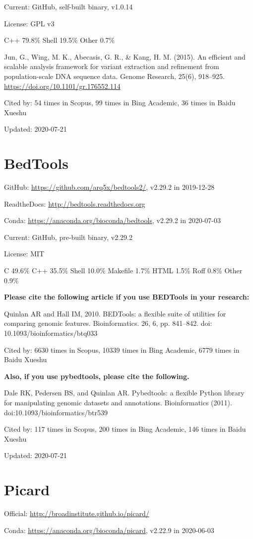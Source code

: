 \documentclass[]{article}
\newcommand{\cb}[3]{\par Cited by: {\color{blue}\Huge #1} times in Scopus, {\color{blue}\Huge #2} times in Bing Academic, {\color{blue}\Huge #3} times in Baidu Xueshu}
\begin{document}
Current: GitHub, self-built binary, v1.0.14

License: GPL v3

C++ 79.8\% Shell 19.5\% Other 0.7\%

Jun, G., Wing, M. K., Abecasis, G. R., \& Kang, H. M. (2015). An efficient and scalable analysis framework for variant extraction and refinement from population-scale DNA sequence data. Genome Research, 25(6), 918–925. \url{https://doi.org/10.1101/gr.176552.114}\cb{54}{99}{36}

Updated: 2020-07-21

\section{BedTools}

GitHub: \url{https://github.com/arq5x/bedtools2/}, v2.29.2 in 2019-12-28

ReadtheDocs: \url{http://bedtools.readthedocs.org}

Conda: \url{https://anaconda.org/bioconda/bedtools}, v2.29.2 in 2020-07-03

Current: GitHub, pre-built binary, v2.29.2

License: MIT

C 49.6\% C++ 35.5\% Shell 10.0\% Makefile 1.7\% HTML 1.5\% Roff 0.8\% Other 0.9\%

\textbf{Please cite the following article if you use BEDTools in your research:}

Quinlan AR and Hall IM, 2010. BEDTools: a flexible suite of utilities for comparing genomic features. Bioinformatics. 26, 6, pp. 841–842.  doi: 10.1093/bioinformatics/btq033 \cb{6630}{10339}{6779}

\textbf{Also, if you use pybedtools, please cite the following.}

Dale RK, Pedersen BS, and Quinlan AR. Pybedtools: a flexible Python library for manipulating genomic datasets and annotations. Bioinformatics (2011). doi:10.1093/bioinformatics/btr539\cb{117}{200}{146}

Updated: 2020-07-21

\section{Picard}

Official: \url{http://broadinstitute.github.io/picard/}

Conda: \url{https://anaconda.org/bioconda/picard}, v2.22.9 in 2020-06-03
\end{document}
